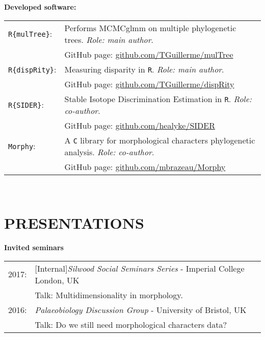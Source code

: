 \documentclass[10pt,a4paper]{article}
\begin{document}
{\raggedright\textbf{Developed software:}\\[1.5ex]
\begin{tabular}{ll}
\texttt{R\{mulTree\}}: & Performs MCMCglmm on multiple phylogenetic trees. \textit{Role: main author}.\\
                       & GitHub page: \href{https://github.com/TGuillerme/mulTree}{github.com/TGuillerme/mulTree} \\
\texttt{R\{dispRity\}}: & Measuring disparity in \texttt{R}. \textit{Role: main author}.\\
                       & GitHub page: \href{https://github.com/TGuillerme/dispRity}{github.com/TGuillerme/dispRity}\\
\texttt{R\{SIDER\}}: & Stable Isotope Discrimination Estimation in \texttt{R}. \textit{Role: co-author}. \\
                       & GitHub page: \href{https://github.com/healyke/SIDER}{github.com/healyke/SIDER} \\
\texttt{Morphy}: & A \texttt{C} library for morphological characters phylogenetic analysis. \textit{Role: co-author}. \\
                       & GitHub page: \href{https://github.com/mbrazeau/Morphy}{github.com/mbrazeau/Morphy} \\
\end{tabular} \\


\bigskip
\section{PRESENTATIONS}

\raggedright\textbf{Invited seminars}\\[1.5ex]
\begin{tabular}{ll}
2017: & [Internal]\textit{Silwood Social Seminars Series} - Imperial College London, UK\\
& Talk: Multidimensionality in morphology.\\ 
2016: & \textit{Palaeobiology Discussion Group} - University of Bristol, UK\\
& Talk: Do we still need morphological characters data?\\ 
\end{tabular}

}
\end{document}
